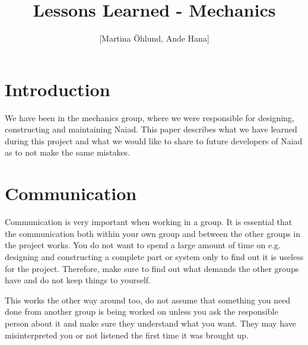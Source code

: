 \documentclass[11pt,a4paper]{amsart}
\title{Lessons Learned - Mechanics}
\author{[Martina \"{O}hlund, Ande Hana]}    					%
\begin{document}
\begin{multicols}{2}

\thispagestyle{empty}
\maketitle


\section{\bf{Introduction}}
\noindent We have been in the mechanics group, where we were responsible for designing, constructing and maintaining Naiad. This paper describes what we have learned during this project and what we would like to share to future developers of Naiad as to not make the same mistakes. 

\section{\bf{Communication}}
\noindent Communication is very important when working in a group. It is essential that the communication both within your own group and between the other groups in the project works. You do not want to spend a large amount of time on e.g. designing and constructing a complete part or system only to find out it is useless for the project. Therefore, make sure to find out what demands the other groups have and do not keep things to yourself. 

This works the other way around too, do not assume that something you need done from another group is being worked on unless you ask the responsible person about it and make sure they understand what you want. They may have misinterpreted you or not listened the first time it was brought up. 


\end{multicols}
\end{document}
